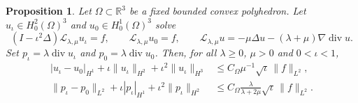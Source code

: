 \documentclass[11pt,a4paper]{article}
\newtheorem{proposition}[theorem]{Proposition}
\theoremstyle{remark}
\numberwithin{equation}{section}
\begin{document}
\begin{proposition}\label{prop:est-sge-transfer}
Let $\Omega\subset\mathbb R^3$ be a fixed bounded convex polyhedron.
Let $u_\iota\in H_0^2(\Omega)^3$ and $u_0\in H_0^1(\Omega)^3$ solve
\[
 (I-\iota^2\Delta)\mathcal L_{\lambda,\mu}u_\iota=f,
 \qquad \mathcal L_{\lambda,\mu}u_0=f,
 \qquad
 \mathcal L_{\lambda,\mu}u=-\mu\Delta u
                     -(\lambda+\mu)\nabla\operatorname{div}u.
\]
Set $p_\iota=\lambda\operatorname{div}u_\iota$ and
$p_0=\lambda\operatorname{div}u_0$. Then, for all
$\lambda\ge0$, $\mu>0$ and $0<\iota<1$,
\begin{align}
 |u_\iota-u_0|_{H^1}+\iota\|u_\iota\|_{H^2}
                  +\iota^2\|u_\iota\|_{H^3}
 &\le C_\Omega\mu^{-1}\sqrt\iota\,\|f\|_{L^2},
 \label{eq:est-sge-u}\\
 \|p_\iota-p_0\|_{L^2}+\iota|p_\iota|_{H^1}
                  +\iota^2\|p_\iota\|_{H^2}
 &\le C_\Omega\frac{\lambda}{\lambda+2\mu}
                    \sqrt\iota\,\|f\|_{L^2}.
 \label{eq:est-sge-p}
\end{align}
\end{proposition}
\end{document}
